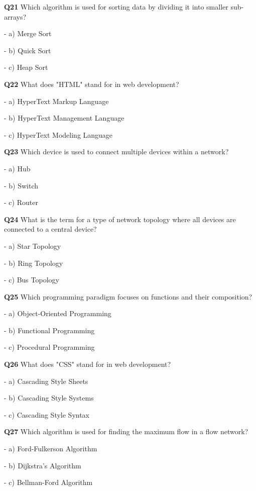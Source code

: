 \textbf{Q21} Which algorithm is used for sorting data by dividing it into smaller sub-arrays?\par
\quad - a) Merge Sort\par
\quad - b) Quick Sort\par
\quad - c) Heap Sort\par

\textbf{Q22} What does "HTML" stand for in web development?\par
\quad - a) HyperText Markup Language\par
\quad - b) HyperText Management Language\par
\quad - c) HyperText Modeling Language\par

\textbf{Q23} Which device is used to connect multiple devices within a network?\par
\quad - a) Hub\par
\quad - b) Switch\par
\quad - c) Router\par

\textbf{Q24} What is the term for a type of network topology where all devices are connected to a central device?\par
\quad - a) Star Topology\par
\quad - b) Ring Topology\par
\quad - c) Bus Topology\par

\textbf{Q25} Which programming paradigm focuses on functions and their composition?\par
\quad - a) Object-Oriented Programming\par
\quad - b) Functional Programming\par
\quad - c) Procedural Programming\par

\textbf{Q26} What does "CSS" stand for in web development?\par
\quad - a) Cascading Style Sheets\par
\quad - b) Cascading Style Systems\par
\quad - c) Cascading Style Syntax\par

\textbf{Q27} Which algorithm is used for finding the maximum flow in a flow network?\par
\quad - a) Ford-Fulkerson Algorithm\par
\quad - b) Dijkstra's Algorithm\par
\quad - c) Bellman-Ford Algorithm\par

